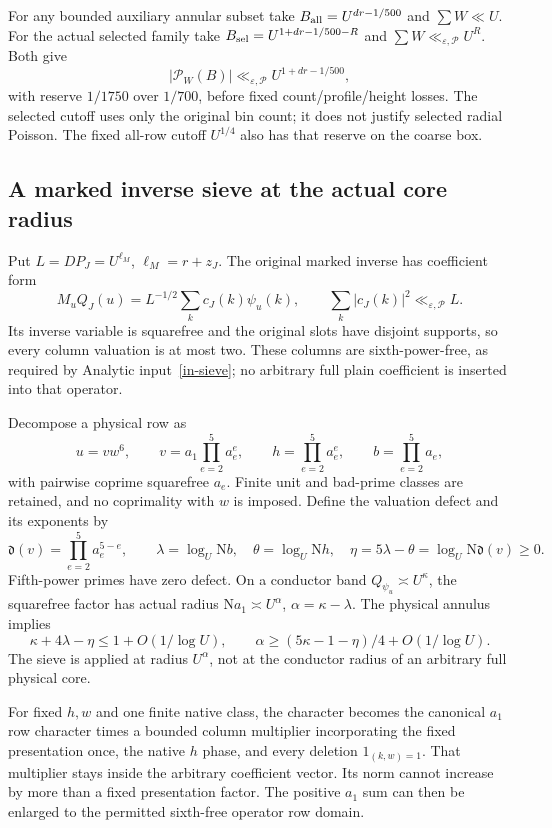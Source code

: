 \documentclass[11pt]{article}
\theoremstyle{definition}
\newcommand{\N}{\mathrm N}
\newcommand{\eps}{\varepsilon}
\newcommand{\lls}{\ll_{\eps,\mathcal P}}
\begin{document}
For any bounded auxiliary annular subset take
$B_{\rm all}=U^{dr-1/500}$ and $\sum W\ll U$.
For the actual selected family take
$B_{\rm sel}=U^{1+dr-1/500-R}$ and $\sum W\lls U^R$.
Both give
\[
 |\mathcal P_W(B)|\lls U^{1+dr-1/500},
\]
with reserve $1/1750$ over $1/700$, before fixed count/profile/height
losses. The selected cutoff uses only the original bin count; it does
not justify selected radial Poisson. The fixed all-row cutoff
$U^{1/4}$ also has that reserve on the coarse box.

\subsection{A marked inverse sieve at the actual core radius}
Put $L=DP_J=U^{\ell_M}$, $\ell_M=r+z_J$. The original
marked inverse has coefficient form
\[
 M_uQ_J(u)=L^{-1/2}\sum_k c_J(k)\psi_u(k),\qquad
 \sum_k|c_J(k)|^2\lls L .
\]
Its inverse variable is squarefree and the original slots have
disjoint supports, so every column valuation is at most two.
These columns are sixth-power-free, as required by
Analytic input~\ref{in-sieve}; no arbitrary full plain coefficient
is inserted into that operator.

Decompose a physical row as
\[
 u=vw^6,\qquad v=a_1\prod_{e=2}^5a_e^e,\qquad
 h=\prod_{e=2}^5a_e^e,\qquad b=\prod_{e=2}^5a_e ,
\]
with pairwise coprime squarefree $a_e$. Finite unit and bad-prime
classes are retained, and no coprimality with $w$ is imposed.
Define the valuation defect and its exponents by
\[
 \mathfrak d(v)=\prod_{e=2}^5a_e^{5-e},\qquad
 \lambda=\log_U\N b,\quad\theta=\log_U\N h,\quad
 \eta=5\lambda-\theta=\log_U\N\mathfrak d(v)\ge0.
\]
Fifth-power primes have zero defect. On a conductor band
$Q_{\psi_u}\asymp U^\kappa$, the squarefree factor has actual
radius $\N a_1\asymp U^\alpha$, $\alpha=\kappa-\lambda$.
The physical annulus implies
\begin{equation}\label{sh-physical-defect}
 \kappa+4\lambda-\eta\le1+O(1/\log U),\qquad
 \alpha\ge(5\kappa-1-\eta)/4+O(1/\log U).
\end{equation}
The sieve is applied at radius $U^\alpha$, not at the conductor
radius of an arbitrary full physical core.

For fixed $h,w$ and one finite native class, the character becomes
the canonical $a_1$ row character times a bounded column multiplier
incorporating the fixed presentation once, the native $h$ phase,
and every deletion $1_{(k,w)=1}$. That multiplier stays inside the
arbitrary coefficient vector. Its norm cannot increase by more than
a fixed presentation factor. The positive $a_1$ sum can then be
enlarged to the permitted sixth-free operator row domain.
\end{document}
